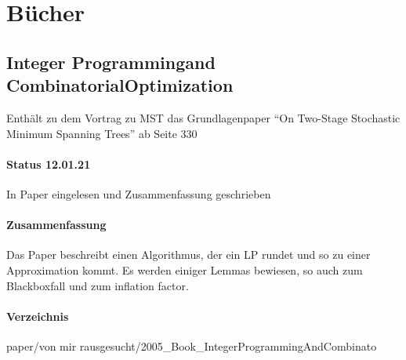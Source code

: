 \documentclass[paper=a4,10pt]{scrartcl}
\begin{document}
\section{Bücher}
\subsection{Integer Programmingand CombinatorialOptimization}
\label{sec:paper_on}
Enthält zu dem Vortrag zu MST das Grundlagenpaper ``On Two-Stage Stochastic Minimum Spanning Trees'' ab Seite 330

\paragraph{Status 12.01.21} In Paper eingelesen und Zusammenfassung geschrieben
\paragraph{Zusammenfassung}	Das Paper beschreibt einen Algorithmus, der ein LP rundet und so zu einer Approximation kommt. Es werden einiger Lemmas bewiesen, so auch zum Blackboxfall und zum inflation factor.
\paragraph{Verzeichnis} paper/von mir rausgesucht/2005\_Book\_IntegerProgrammingAndCombinato
\end{document}
